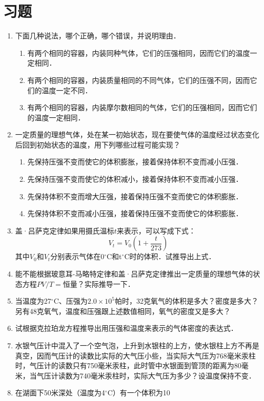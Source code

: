 \section*{习题}
\begin{enumerate}
	\item 下面几种说法，哪个正确，哪个错误，并说明理由．
	\begin{enumerate}
		\item 有两个相同的容器，内装同种气体，它们的压强相同，因而它们的温度一定相同．
		\item 有两个相同的容器，内装质量相同的不同气体，它们的压强不同，因而它们的温度一定不同．
		\item 有两个相同的容器，内装摩尔数相同的气体，它们的压强相同，因而它们的温度一定相同．
	\end{enumerate}
\item 一定质量的理想气体，处在某一初始状态，现在要使气体的温度经过状态变化后回到初始状态的温度，用下列哪些过程可能实现？
\begin{enumerate}
	\item 先保持压强不变而使它的体积膨胀，接着保持体积不变而减小压强．
\item 先保持压强不变而使它的体积减小，接着保持体积不变而减小压强．
\item 先保持体积不变而增大压强，接着保持压强不变而使它的体积膨胀．
\item 先保持体积不变而减小压强，接着保持压强不变而使它的体积膨胀．	 
\end{enumerate}
\item 盖·吕萨克定律如果用摄氏温标$t$来表示，可以写成下式：
\[V_t=V_0\left(1+\frac{t}{273}\right) \]
其中$V_0$和$V_t$分别表示气体在0$^\circ$C和t$^\circ$C时的体积．试推导出上式．
\item 能不能根据玻意耳-马略特定律和盖·吕萨克定律推出一定质量的理想气体的状态方程$PV/T=$恒量？实际推导一下．
\item 当温度为27$^\circ$C、压强为$2.0\times 10^5$帕时，32克氧气的体积是多大？密度是多大？另有48克氧气，温度和压强跟上述数值相同，氧气的密度又是多大？	
\item   试根据克拉珀龙方程推导出用压强和温度来表示的气体密度的表达式．
\item  水银气压计中混入了一个空气泡，上升到水银柱的上方，使水银柱上方不再是真空，因而气压计的读数比实际的大气压小些，当实际大气压为768毫米汞柱时，气压计的读数只有750毫米汞柱，此时管中水银面到管顶的距离为80毫米，当气压计读数为740毫米汞柱时，实际大气压为多少？设温度保持不变．
\item  在湖面下50米深处（温度为4$^\circ$C）有一个体积为10

\end{enumerate}
